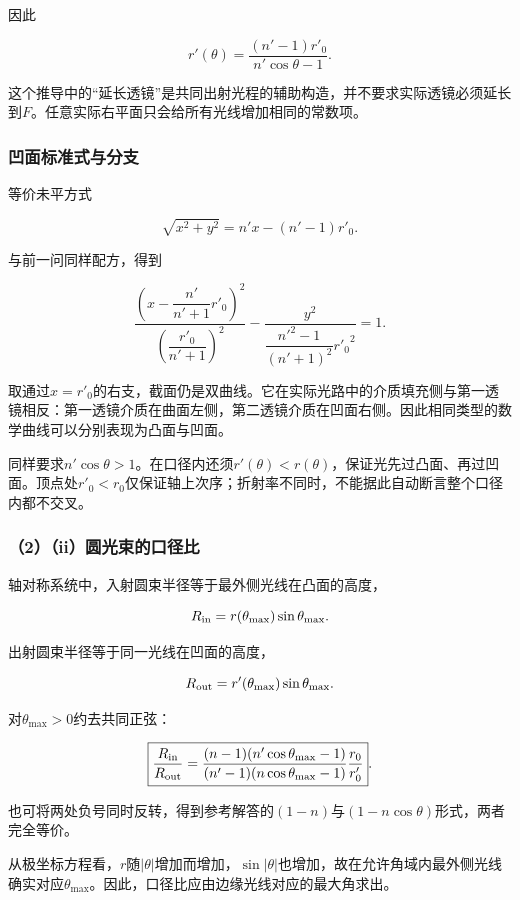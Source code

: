 \documentclass[12pt,a4paper,fontset=fandol]{ctexart}
\begin{document}
因此

\[
\boxed{
r'(\theta)=\frac{(n'-1)r'_0}{n'\cos\theta-1}}.
\]

这个推导中的``延长透镜''是共同出射光程的辅助构造，并不要求实际透镜必须延长到\(F\)。任意实际右平面只会给所有光线增加相同的常数项。

\subsubsection{凹面标准式与分支}\label{ux51f9ux9762ux6807ux51c6ux5f0fux4e0eux5206ux652f}

等价未平方式

\[
\sqrt{x^2+y^2}=n'x-(n'-1)r'_0.
\]

与前一问同样配方，得到

\[
\boxed{
\frac{\left(x-\dfrac{n'}{n'+1}r'_0\right)^2}
{\left(\dfrac{r'_0}{n'+1}\right)^2}
-\frac{y^2}{\dfrac{n'^2-1}{(n'+1)^2}{r'_0}^2}=1}.
\]

取通过\(x=r'_0\)的右支，截面仍是双曲线。它在实际光路中的介质填充侧与第一透镜相反：第一透镜介质在曲面左侧，第二透镜介质在凹面右侧。因此相同类型的数学曲线可以分别表现为凸面与凹面。

同样要求\(n'\cos\theta>1\)。在口径内还须\(r'(\theta)<r(\theta)\)，保证光先过凸面、再过凹面。顶点处\(r'_0<r_0\)仅保证轴上次序；折射率不同时，不能据此自动断言整个口径内都不交叉。

\subsubsection{（2）（ii）圆光束的口径比}\label{iiux5706ux5149ux675fux7684ux53e3ux5f84ux6bd4}

轴对称系统中，入射圆束半径等于最外侧光线在凸面的高度，

\[
R_{\rm in}=r(\theta_{\max})\sin\theta_{\max}.
\]

出射圆束半径等于同一光线在凹面的高度，

\[
R_{\rm out}=r'(\theta_{\max})\sin\theta_{\max}.
\]

对\(\theta_{\max}>0\)约去共同正弦：

\[
\boxed{
\frac{R_{\rm in}}{R_{\rm out}}
=\frac{(n-1)(n'\cos\theta_{\max}-1)}
{(n'-1)(n\cos\theta_{\max}-1)}
\frac{r_0}{r'_0}}.
\]

也可将两处负号同时反转，得到参考解答的\((1-n)\)与\((1-n\cos\theta)\)形式，两者完全等价。

从极坐标方程看，\(r\)随\(|\theta|\)增加而增加，\(\sin|\theta|\)也增加，故在允许角域内最外侧光线确实对应\(\theta_{\max}\)。因此，口径比应由边缘光线对应的最大角求出。
\end{document}
